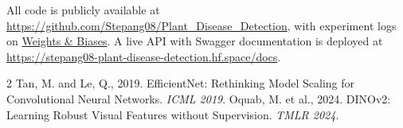\documentclass[11pt, a4paper]{article}
\begin{document}
All code is publicly available at \url{https://github.com/Stepang08/Plant_Disease_Detection}, with experiment logs on \href{https://wandb.ai/stepan-goyunyan-physmath-school-after-a-shahinyan-/plant-disease-classifier}{Weights \& Biases}. A live API with Swagger documentation is deployed at \url{https://stepang08-plant-disease-detection.hf.space/docs}.

\begin{thebibliography}{2}
 Tan, M. and Le, Q., 2019. EfficientNet: Rethinking Model Scaling for Convolutional Neural Networks. \textit{ICML 2019}.
 Oquab, M. et al., 2024. DINOv2: Learning Robust Visual Features without Supervision. \textit{TMLR 2024}.
\end{thebibliography}
\end{document}
